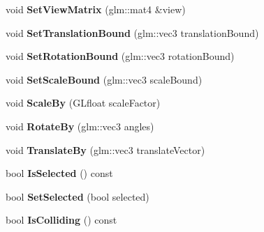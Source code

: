 \begin{DoxyCompactItemize}
\item 
\hypertarget{class_model_container_a14648db778747762f55ad52396225efa}{}void {\bfseries Set\+View\+Matrix} (glm\+::mat4 \&view)\label{class_model_container_a14648db778747762f55ad52396225efa}

\item 
\hypertarget{class_model_container_afb5c293199114bcd6da5bea8b964b732}{}void {\bfseries Set\+Translation\+Bound} (glm\+::vec3 translation\+Bound)\label{class_model_container_afb5c293199114bcd6da5bea8b964b732}

\item 
\hypertarget{class_model_container_a9d5ae2036e06e9230942fb45b8f5156a}{}void {\bfseries Set\+Rotation\+Bound} (glm\+::vec3 rotation\+Bound)\label{class_model_container_a9d5ae2036e06e9230942fb45b8f5156a}

\item 
\hypertarget{class_model_container_a9bc78b840b5bb544db86cb5956b17a12}{}void {\bfseries Set\+Scale\+Bound} (glm\+::vec3 scale\+Bound)\label{class_model_container_a9bc78b840b5bb544db86cb5956b17a12}

\item 
\hypertarget{class_model_container_ac8d13143fdc69ce02d2539dd677bc3db}{}void {\bfseries Scale\+By} (G\+Lfloat scale\+Factor)\label{class_model_container_ac8d13143fdc69ce02d2539dd677bc3db}

\item 
\hypertarget{class_model_container_a40a0e922136e185a3808dac214d9cea8}{}void {\bfseries Rotate\+By} (glm\+::vec3 angles)\label{class_model_container_a40a0e922136e185a3808dac214d9cea8}

\item 
\hypertarget{class_model_container_ac33db8cfd1cac6742735dcc0226feff0}{}void {\bfseries Translate\+By} (glm\+::vec3 translate\+Vector)\label{class_model_container_ac33db8cfd1cac6742735dcc0226feff0}

\item 
\hypertarget{class_model_container_a349647d2eccc777419ff6eeb8edeff90}{}bool {\bfseries Is\+Selected} () const \label{class_model_container_a349647d2eccc777419ff6eeb8edeff90}

\item 
\hypertarget{class_model_container_a56c9edb4f2eb179a213e639dbaa05c9e}{}bool {\bfseries Set\+Selected} (bool selected)\label{class_model_container_a56c9edb4f2eb179a213e639dbaa05c9e}

\item 
\hypertarget{class_model_container_ad772dd3ae73fa1f3237c83e97a5fc80b}{}bool {\bfseries Is\+Colliding} () const \label{class_model_container_ad772dd3ae73fa1f3237c83e97a5fc80b}


\end{DoxyCompactItemize}
